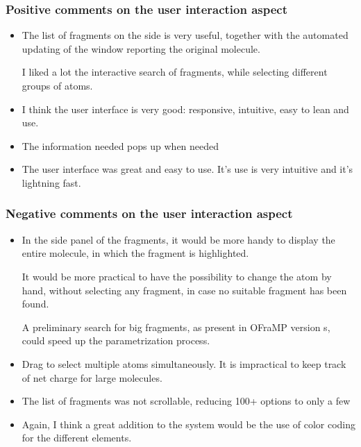 \subsubsection{Positive comments on the user interaction aspect}
\begin{itemize}
\item The list of fragments on the side is very useful, together with the automated updating of the window reporting the original molecule.

I liked a lot the interactive search of fragments, while selecting different groups of atoms.

\item I think the user interface is very good: responsive, intuitive, easy to lean and use. 

\item The information needed pops up when needed

\item The user interface was great and easy to use. It's use is very intuitive and it's lightning fast.

\end{itemize}


\subsubsection{Negative comments on the user interaction aspect}
\begin{itemize}
\item In the side panel of the fragments, it would be more handy to display the entire molecule, in which the fragment is highlighted.

It would be more practical to have the possibility to change the atom by hand, without selecting any fragment, in case no suitable fragment has been found.

A preliminary search for big fragments, as present in OFraMP version s, could speed up the parametrization process.

\item Drag to select multiple atoms simultaneously.  It is impractical to keep track of net charge for large molecules. 

\item The list of fragments was not scrollable, reducing 100+ options to only a few

\item Again, I think a great addition to the system would be the use of color coding for the different elements.

\end{itemize}


